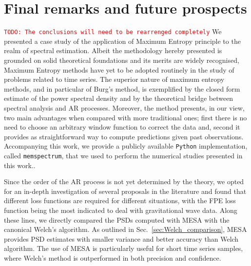 \documentclass{aa}
\newcommand{\todo}[1]{{\textcolor{red}{\texttt{TODO: #1}} }}
\begin{document}
\section{Final remarks and future prospects} \label{sec:conclusion}
\todo{The conclusions will need to be rearrenged completely}
We presented a case study of the application of Maximum Entropy principle to the realm of spectral estimation. Albeit the methodology hereby presented is grounded on solid theoretical foundations and its merits are widely recognised, Maximum Entropy methods have yet to be adopted routinely in the study of problems related to time series. The superior nature of maximum entropy methods, and in particular of Burg's method, is exemplified by the closed form estimate of the power spectral density and by the theoretical bridge between spectral analysis and AR processes. Moreover, the method presents, in our view, two main advantages when compared with more traditional ones; first there is no need to choose an arbitrary window function to correct the data and, second it provides as straightforward way to compute predictions given past observations. Accompanying this work, we provide a publicly available \texttt{Python} implementation, called \texttt{memspectrum}, that we used to perform the numerical studies presented in this work.. 

Since the order of the AR process is not yet determined by the theory, we opted for an in-depth investigation of several proposals in the literature and found that different loss functions are required for different situations, with the FPE loss function being the most indicated to deal with gravitational wave data. Along these lines, we directly compared the PSDs computed with MESA with the canonical Welch's algorithm. As outlined in Sec.~\ref{sec:Welch_comparison}, MESA provides PSD estimates with smaller variance and better accuracy than Welch algorithm.
The use of MESA is particularly useful for short time series samples, where Welch's method is outperformed in both precision and confidence.
 
\end{document}
